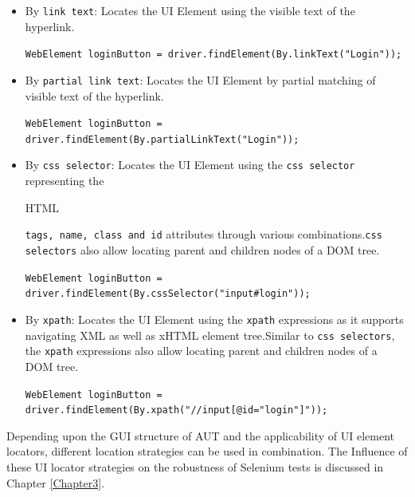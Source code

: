 \begin{itemize}
\item 
By \texttt{link text}:
Locates the UI Element using the visible text of the hyperlink.
\newline
\begin{footnotesize}
\texttt{WebElement loginButton = driver.findElement(By.linkText("Login"));
}
\end{footnotesize}

\item 
By \texttt{partial link text}:
Locates the UI Element by partial matching of visible text of the hyperlink.
\newline
\begin{footnotesize}
\texttt{WebElement loginButton = driver.findElement(By.partialLinkText("Login"));
}
\end{footnotesize}
\item 
By \texttt{css selector}:
Locates the UI Element using the \texttt{css selector} representing the \begin{footnotesize} HTML\end{footnotesize} \texttt{tags, name, class and id} attributes through various combinations.\texttt{css selectors} also allow locating parent and children nodes of a DOM tree. 
\newline
\begin{footnotesize}
\texttt{WebElement loginButton = driver.findElement(By.cssSelector("input\#login"));
}
\end{footnotesize}
\item 
By \texttt{xpath}:
Locates the UI Element using the \texttt{xpath} expressions as it supports navigating XML as well as xHTML element tree.Similar to \texttt{css selectors}, the \texttt{xpath} expressions also allow locating parent and children nodes of a DOM tree. 
\newline
\begin{footnotesize}
\texttt{WebElement loginButton = driver.findElement(By.xpath("//input[@id="login"]"));
}
\end{footnotesize}
\end{itemize}
Depending upon the GUI structure of AUT and the applicability of UI element locators, different location strategies can be used in combination. The Influence of these UI locator strategies on the robustness of Selenium tests is discussed in Chapter \ref{Chapter3}.
